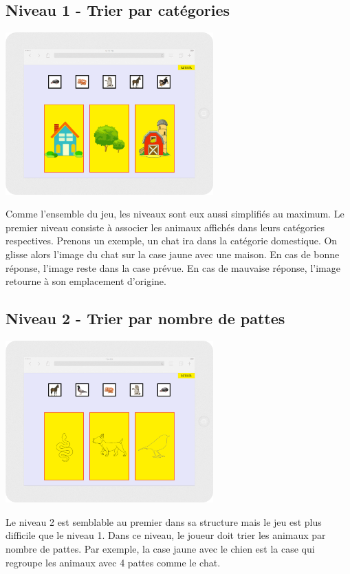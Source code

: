 \documentclass{article}
\begin{document}
\subsection{Niveau 1 - Trier par cat\'egories}
\vspace{0.5cm}
\begin{center}
\includegraphics[width=0.6\textwidth]{page2}
\end{center}
\vspace{0.5cm}
\hspace*{0.6cm}Comme l'ensemble du jeu, les niveaux sont eux aussi simplifi\'es au maximum.
Le premier niveau consiste \`a associer les animaux affich\'es dans leurs cat\'egories respectives. Prenons un exemple, un chat ira dans la cat\'egorie domestique. On glisse alors l'image du chat sur la case jaune avec une maison. En cas de bonne r\'eponse, l'image reste dans la case pr\'evue. En cas de mauvaise r\'eponse, l'image retourne \`a son emplacement d'origine.
\subsection{Niveau 2 - Trier par nombre de pattes}
\vspace{0.5cm}
\begin{center}
\includegraphics[width=0.6\textwidth]{page3}
\end{center}
\vspace{0.5cm}
\hspace*{0.6cm}Le niveau 2 est semblable au premier dans sa structure mais le jeu est plus difficile que le niveau 1. Dans ce niveau, le joueur doit trier les animaux par nombre de pattes. Par exemple, la case jaune avec le chien est la case qui regroupe les animaux avec 4 pattes comme le chat.
\end{document}
